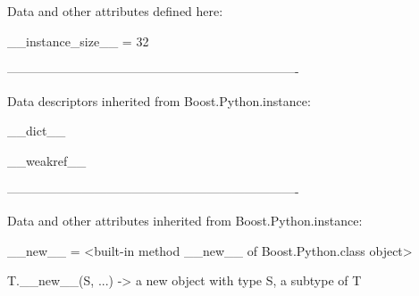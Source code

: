 \documentclass[letterpaper,10pt,english]{sphinxmanual}
\begin{document}
\begin{description}
\begin{description}
\begin{DUlineblock}{0em}
\item[] Data and other attributes defined here:
\item[] 
\item[] \_\_instance\_size\_\_ = 32
\item[] 
\item[] ----------------------------------------------------------------------
\item[] Data descriptors inherited from Boost.Python.instance:
\item[] 
\item[] \_\_dict\_\_
\item[] 
\item[] \_\_weakref\_\_
\item[] 
\item[] ----------------------------------------------------------------------
\item[] Data and other attributes inherited from Boost.Python.instance:
\item[] 
\item[] \_\_new\_\_ = \textless{}built-in method \_\_new\_\_ of Boost.Python.class object\textgreater{}
\item[]
\begin{DUlineblock}{\DUlineblockindent}
\item[] T.\_\_new\_\_(S, ...) -\textgreater{} a new object with type S, a subtype of T
\end{DUlineblock}
\end{DUlineblock}


\end{description}
\end{description}
\end{document}

